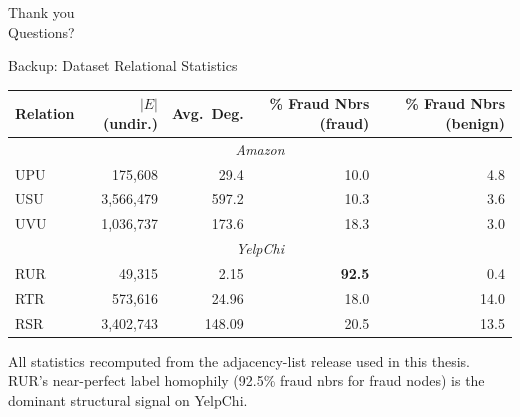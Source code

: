 \documentclass[aspectratio=169,10pt]{beamer}
\begin{document}
\begin{frame}[standout]
    Thank you \\[0.5em]
    \normalsize Questions?
\end{frame}

\appendix

\begin{frame}{Backup: Dataset Relational Statistics}
    \begin{center}\footnotesize
    \begin{tabular}{@{}lrrrr@{}}
        \toprule
        \textbf{Relation} & $|E|$ (undir.) & Avg.\ Deg. & \% Fraud Nbrs (fraud) & \% Fraud Nbrs (benign) \\
        \midrule
        \multicolumn{5}{c}{\textit{Amazon}} \\
        \midrule
        UPU & 175{,}608     & 29.4  & 10.0 & 4.8 \\
        USU & 3{,}566{,}479 & 597.2 & 10.3 & 3.6 \\
        UVU & 1{,}036{,}737 & 173.6 & 18.3 & 3.0 \\
        \midrule
        \multicolumn{5}{c}{\textit{YelpChi}} \\
        \midrule
        RUR & 49{,}315     & 2.15   & \textbf{92.5} & 0.4  \\
        RTR & 573{,}616    & 24.96  & 18.0 & 14.0 \\
        RSR & 3{,}402{,}743 & 148.09 & 20.5 & 13.5 \\
        \bottomrule
    \end{tabular}
    \end{center}
    \vspace{0.3em}
    \footnotesize
    All statistics recomputed from the adjacency-list release used in this thesis.
    RUR's near-perfect label homophily (92.5\% fraud nbrs for fraud nodes) is the
    dominant structural signal on YelpChi.
\end{frame}
\end{document}
